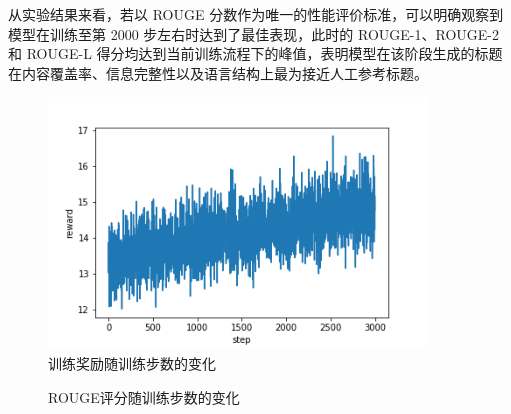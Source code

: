 \documentclass[10pt,a4paper]{article}
\begin{document}
从实验结果来看，若以 ROUGE 分数作为唯一的性能评价标准，可以明确观察到模型在训练至第 2000 步左右时达到了最佳表现，此时的 ROUGE-1、ROUGE-2 和 ROUGE-L 得分均达到当前训练流程下的峰值，表明模型在该阶段生成的标题在内容覆盖率、信息完整性以及语言结构上最为接近人工参考标题。

\begin{figure}[H]
  \centering
  \includegraphics[width=10cm]{fig/reward.png}
  \caption{训练奖励随训练步数的变化}\label{fig:reward}
\end{figure}

\begin{figure}[H]
  \hspace{0.1in}
  \hspace{0.1in}
  \hspace{0.1in}
  \hspace{0.1in}
  \caption{ROUGE评分随训练步数的变化}\label{fig:rouge}
\end{figure}
\end{document}
